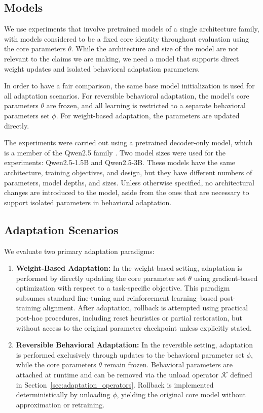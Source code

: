 \documentclass[10pt]{article}
\begin{document}
	\subsection{Models}
	\label{sec:models}
	
We use experiments that involve pretrained models of a single architecture family, with models considered to be a fixed core identity throughout evaluation using the core parameters $\theta$. While the architecture and size of the model are not relevant to the claims we are making, we need a model that supports direct weight updates and isolated behavioral adaptation parameters.

In order to have a fair comparison, the same base model initialization is used for all adaptation scenarios. For reversible behavioral adaptation, the model's core parameters $\theta$ are frozen, and all learning is restricted to a separate behavioral parameters set $\phi$. For weight-based adaptation, the parameters are updated directly.

The experiments were carried out using a pretrained decoder-only model, which is a member of the Qwen2.5 family \cite{qwen2024qwen2}. Two model sizes were used for the experiments: Qwen2.5-1.5B and Qwen2.5-3B. These models have the same architecture, training objectives, and design, but they have different numbers of parameters, model depths, and sizes. Unless otherwise specified, no architectural changes are introduced to the model, aside from the ones that are necessary to support isolated parameters in behavioral adaptation.
	
	
	\subsection{Adaptation Scenarios}
	\label{sec:adaptation_scenarios}
	
	We evaluate two primary adaptation paradigms:
	\begin{enumerate}
		\item \textbf{Weight-Based Adaptation:} In the weight-based setting, adaptation is performed by directly updating the core parameter set $\theta$ using gradient-based optimization with respect to a task-specific objective. This paradigm subsumes standard fine-tuning and reinforcement learning–based post-training alignment. After adaptation, rollback is attempted using practical post-hoc procedures, including reset heuristics or partial restoration, but without access to the original parameter checkpoint unless explicitly stated.
		\item \textbf{Reversible Behavioral Adaptation:} In the reversible setting, adaptation is performed exclusively through updates to the behavioral parameter set $\phi$, while the core parameters $\theta$ remain frozen. Behavioral parameters are attached at runtime and can be removed via the unload operator $\mathcal{K}$ defined in Section~\ref{sec:adaptation_operators}. Rollback is implemented deterministically by unloading $\phi$, yielding the original core model without approximation or retraining.
	\end{enumerate}
	
\end{document}

